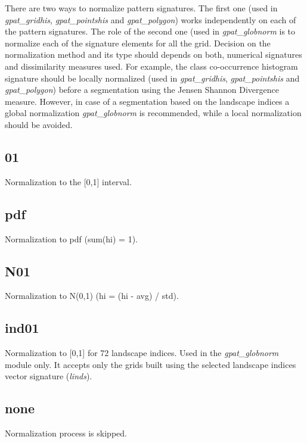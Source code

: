 There are two ways to normalize pattern signatures.
The first one (used in {\it gpat\_gridhis}, {\it gpat\_pointshis} and {\it gpat\_polygon}) works independently on each of the pattern signatures.
The role of the second one (used in {\it gpat\_globnorm} is to normalize each of the signature elements for all the grid. 
Decision on the normalization method and its type should depends on both, numerical signatures and dissimilarity measures used.
For example, the class co-occurrence histogram signature should be locally normalized (used in {\it gpat\_gridhis}, {\it gpat\_pointshis} and {\it gpat\_polygon}) before a segmentation using the Jensen Shannon Divergence measure.
However, in case of a segmentation based on the landscape indices a global normalization {\it gpat\_globnorm} is recommended, while a local normalization should be avoided.

\subsection{01}

Normalization to the [0,1] interval.

\subsection{pdf}

Normalization to pdf (sum(hi) = 1).

\subsection{N01}

Normalization to N(0,1) (hi = (hi - avg) / std).

\subsection{ind01}

Normalization to [0,1] for 72 landscape indices.
Used in the {\it gpat\_globnorm} module only.
It accepts only the grids built using the selected landscape indices vector signature ({\it linds}).

\subsection{none}

Normalization process is skipped. 
